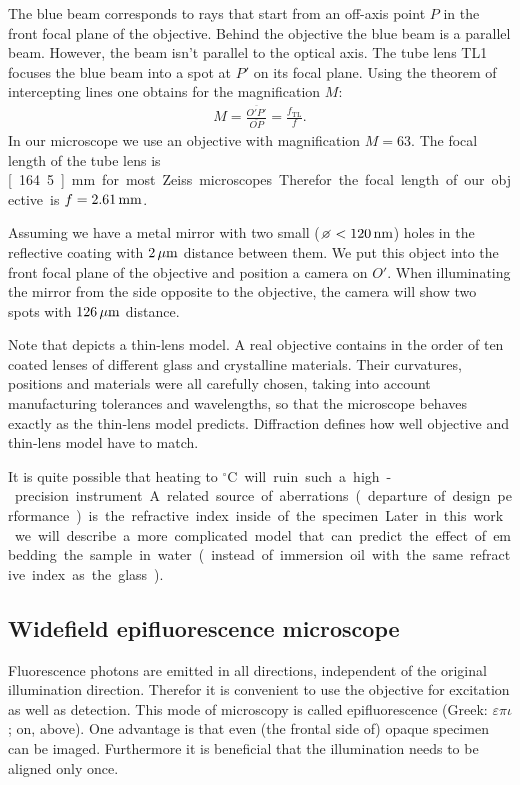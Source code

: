The blue beam corresponds to rays that start from an off-axis point
$P$ in the front focal plane of the objective. Behind the objective
the blue beam is a parallel beam. However, the beam isn't parallel to
the optical axis. The tube lens TL1 focuses the blue beam into a spot
at $P'$ on its focal plane. Using the theorem of intercepting lines
one obtains for the magnification $M$:
\begin{align}
  M=\frac{\overline{O'P'}}{\overline{OP}}=\frac{f_\textrm{TL}}{f}.
\end{align}
In our microscope we use an objective with magnification $M=63$. The
focal length of the tube lens is \unit[164.5]{mm} for most Zeiss
microscopes. Therefor the focal length of our objective is
$f=\unit[2.61]{mm}$.

Assuming we have a metal mirror with two small
($\diameter<\unit[120]{nm}$) holes in the reflective coating with
$\unit[2]{\mu m}$ distance between them.  We put this object into the
front focal plane of the objective and position a camera on $O'$. When
illuminating the mirror from the side opposite to the objective, the
camera will show two spots with $\unit[126]{\mu m}$ distance.

Note that  depicts a thin-lens
model. A real objective contains in the order of ten coated lenses of
different glass and crystalline materials. Their curvatures, positions
and materials were all carefully chosen, taking into account
manufacturing tolerances and wavelengths, so that the microscope
behaves exactly as the thin-lens model predicts. Diffraction defines
how well objective and thin-lens model have to match.

It is quite possible that heating to \unit[37]{${}^\circ$C} will ruin
such a high-precision instrument. A related source of aberrations
(departure of design performance) is the refractive index inside of
the specimen. Later in this work  %
we will describe a more complicated model that can predict the effect
of embedding the sample in water (instead of immersion oil with the
same refractive index as the glass).

\subsection{Widefield epifluorescence microscope}
Fluorescence photons are emitted in all directions, independent of the
original illumination direction. Therefor it is convenient to use the
objective for excitation as well as detection. This mode of microscopy
is called epifluorescence (Greek: $\varepsilon\pi\iota$; on, above).
One advantage is that even (the frontal side of) opaque specimen can
be imaged. Furthermore it is beneficial that the illumination needs to
be aligned only once.

